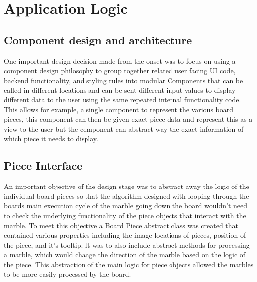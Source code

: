 \documentclass{l4proj}
\begin{document}
\section{Application Logic}
\subsection{Component design and architecture}
One important design decision made from the onset was to focus on using a component design philosophy to group together related user facing UI code, backend functionality, and styling rules into modular Components that can be called in different locations and can be sent different input values to display different data to the user using the same repeated internal functionality code. This allows for example, a single component to represent the various board pieces, this component can then be given exact piece data and represent this as a view to the user but the component can abstract way the exact information of which piece it needs to display.

\subsection{Piece Interface}
An important objective of the design stage was to abstract away the logic of the individual board pieces so that the algorithm designed with looping through the boards main execution cycle of the marble going down the board wouldn't need to check the underlying functionality of the piece objects that interact with the marble. To meet this objective a Board Piece abstract class was created that contained various properties including the image locations of pieces, position of the piece, and it's tooltip. It was to also include abstract methods for processing a marble, which would change the direction of the marble based on the logic of the piece. This abstraction of the main logic for piece objects allowed the marbles to be more easily processed by the board.
\end{document}
